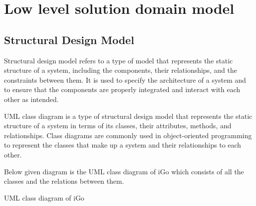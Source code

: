 \documentclass[a4paper,12pt]{article}
\begin{document}
\newpage
\section{Low level solution domain model}
\subsection{Structural Design Model}
Structural design model refers to a type of model that represents the static structure of a system, including the components, their relationships, and the constraints between them. It is used to specify the architecture of a system and to ensure that the components are properly integrated and interact with each other as intended. \\ \par

UML class diagram is a type of structural design model that represents the static structure of a system in terms of its classes, their attributes, methods, and relationships. Class diagrams are commonly used in object-oriented programming to represent the classes that make up a system and their relationships to each other.\\ \par

Below given diagram is the UML class diagram of iGo which consists of all the classes and the relations between them. \\
\begin{center}
\caption{UML class diagram of iGo}
\end{center}
\end{document}
